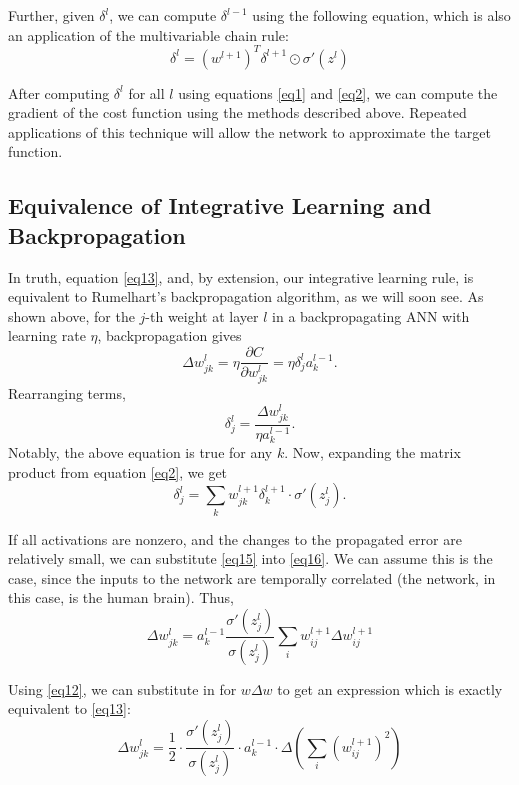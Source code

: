 \documentclass[12pt]{article}
\newcommand{\partialderiv}[2]{\frac{\partial #1}{\partial #2}}
\begin{document}
Further, given $\delta^l$, we can compute $\delta^{l-1}$ using the following equation, which is also an application of the multivariable chain rule:
\begin{equation}
	\delta^l = \left(w^{l+1}\right)^T\delta^{l+1}\odot\sigma'\left(z^l\right)\label{eq2}
\end{equation}

After computing $\delta^l$ for all $l$ using equations \ref{eq1} and \ref{eq2}, we can compute the gradient of the cost function using the methods described above. Repeated applications of this technique will allow the network to approximate the target function.

\subsection{Equivalence of Integrative Learning and Backpropagation}
In truth, equation \ref{eq13}, and, by extension, our integrative learning rule, is equivalent to Rumelhart's backpropagation algorithm, as we will soon see. As shown above, for the $j$-th weight at layer $l$ in a backpropagating ANN with learning rate $\eta$, backpropagation gives
\begin{equation}
	\Delta w_{jk}^l = \eta\partialderiv{C}{w_{jk}^l} = \eta\delta_{j}^l a_k^{l-1}.\label{eq15.5}
\end{equation}
Rearranging terms,
\begin{equation}
	\delta_j^l = \frac{\Delta w_{jk}^l}{\eta a_k^{l-1}}\label{eq15}.
\end{equation}
Notably, the above equation is true for any $k$. Now, expanding the matrix product from equation \ref{eq2}, we get
\begin{equation}
	\delta_j^l = \sum_k w_{jk}^{l+1} \delta_k^{l+1}\cdot\sigma'\left(z_j^l\right)\label{eq16}.
\end{equation}

If all activations are nonzero, and the changes to the propagated error are relatively small, we can substitute \ref{eq15} into \ref{eq16}. We can assume this is the case, since the inputs to the network are temporally correlated (the network, in this case, is the human brain). Thus,
\begin{equation}
	\Delta w_{jk}^l = a_k^{l-1}\frac{\sigma'\left(z_j^l\right)}{\sigma\left(z_j^l\right)}\sum_i w_{ij}^{l+1}\Delta w_{ij}^{l+1}
\end{equation}

Using \ref{eq12}, we can substitute in for $w\Delta w$ to get an expression which is exactly equivalent to \ref{eq13}:
\begin{equation}
	\Delta w_{jk}^l = \frac{1}{2}\cdot \frac{\sigma'\left(z_j^l\right)}{\sigma\left(z_j^l\right)}\cdot a_k^{l-1}\cdot\Delta\left(\sum_i \left(w_{ij}^{l+1}\right)^2\right)
\end{equation}
\end{document}
